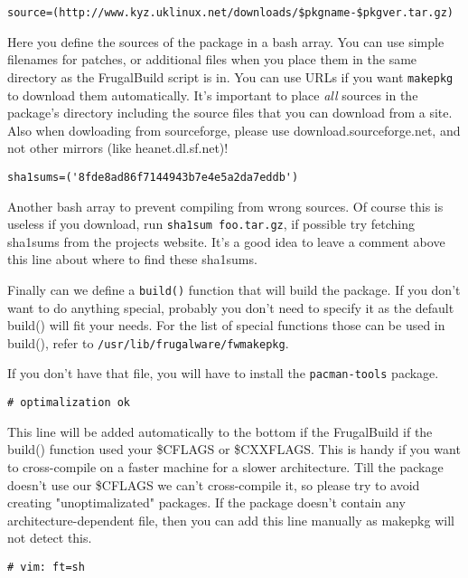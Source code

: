 \begin{verbatim}
source=(http://www.kyz.uklinux.net/downloads/$pkgname-$pkgver.tar.gz)
\end{verbatim}

Here you define the sources of the package in a bash array. You can use simple
filenames for patches, or additional files when you place them in the same
directory as the FrugalBuild script is in. You can use URLs if you want
{\tt makepkg} to download them automatically. It's important to place
\textit{all} sources in the package's directory including the source files
that you can download from a site.
Also when dowloading from sourceforge, please use download.sourceforge.net, and
not other mirrors (like heanet.dl.sf.net)!

\begin{verbatim}
sha1sums=('8fde8ad86f7144943b7e4e5a2da7eddb')
\end{verbatim}

Another bash array to prevent compiling from wrong sources. Of course this is
useless if you download, run {\tt sha1sum foo.tar.gz}, if possible try fetching
sha1sums from the projects website. It's a good idea to leave a comment above
this line about where to find these sha1sums.

Finally can we define a {\tt build()} function that will build the package.
If you don't want to do anything special, probably you don't need to specify it
as the default build() will fit your needs. For the list of special functions
those can be used in build(), refer to {\tt /usr/lib/frugalware/fwmakepkg}.

If you don't have that file, you will have to install the {\tt pacman-tools}
package.

\begin{verbatim}
# optimalization ok
\end{verbatim}

This line will be added automatically to the bottom if the FrugalBuild if the
build() function used your \$CFLAGS or \$CXXFLAGS. This is handy if you want to
cross-compile on a faster machine for a slower architecture. Till the package
doesn't use our \$CFLAGS we can't cross-compile it, so please try to avoid
creating "unoptimalizated" packages. If the package doesn't contain any
architecture-dependent file, then you can add this line manually as makepkg
will not detect this.

\begin{verbatim}
# vim: ft=sh
\end{verbatim}

